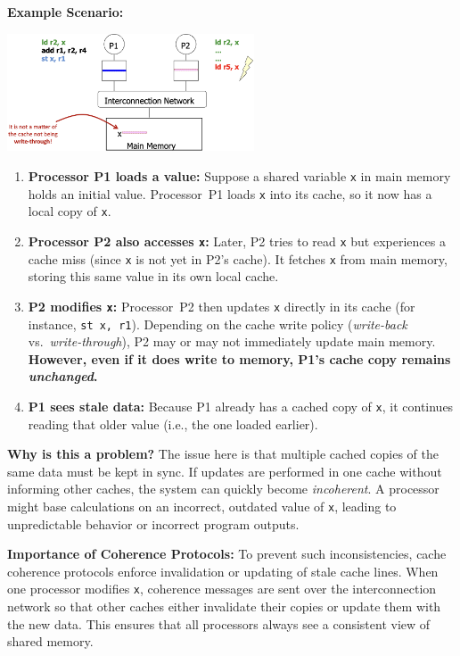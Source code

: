 \medskip

\noindent
\textbf{Example Scenario:}
\begin{center}
    \includegraphics[width=0.55\textwidth]{chapters/chapter5a/images/incoherence.png}
\end{center}
\begin{enumerate}
  \item \textbf{Processor P1 loads a value:} Suppose a shared variable
  \texttt{x} in main memory holds an initial value. Processor~P1 loads
  \texttt{x} into its cache, so it now has a local copy of \texttt{x}.
  \item \textbf{Processor P2 also accesses \texttt{x}:} Later, P2 tries
  to read \texttt{x} but experiences a cache miss (since \texttt{x} is
  not yet in P2's cache). It fetches \texttt{x} from main memory, storing
  this same value in its own local cache.
  \item \textbf{P2 modifies \texttt{x}:} Processor~P2 then updates
  \texttt{x} directly in its cache (for instance, \texttt{st x, r1}).
  Depending on the cache write policy (\emph{write-back} vs.\
  \emph{write-through}), P2 may or may not immediately update main memory.
  \textbf{However, even if it does write to memory, P1's cache copy remains
  \emph{unchanged}.}
  \item \textbf{P1 sees stale data:} Because P1 already has a cached
  copy of \texttt{x}, it continues reading that older value (i.e.,
  the one loaded earlier).
\end{enumerate}

\medskip

\noindent
\textbf{Why is this a problem?}
The issue here is that multiple cached copies of the same data
must be kept in sync. If updates are performed in one cache without
informing other caches, the system can quickly become \emph{incoherent}.
A processor might base calculations on an incorrect, outdated value of
\texttt{x}, leading to unpredictable behavior or incorrect program
outputs.

\medskip

\noindent
\textbf{Importance of Coherence Protocols:}
To prevent such inconsistencies, cache coherence protocols enforce
invalidation or updating of stale cache lines. When one processor
modifies \texttt{x}, coherence messages are sent over the interconnection
network so that other caches either invalidate their copies or update
them with the new data. This ensures that all processors always see
a consistent view of shared memory.

